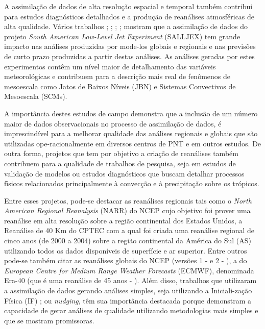 A assimilação de dados de alta resolução espacial e temporal também contribui para estudos diagnósticos detalhados e a produção de reanálises atmosféricas de alta qualidade. Vários trabalhos \cite{cavalcantiherdies04}; \cite{herdiesetal06}; \cite{rozantecavalcanti07}; \cite{herdiesetal07}; \cite{skabarnicolini09} mostram que a assimilação de dados do projeto \textit{South American Low-Level Jet Experiment} (SALLJEX) tem grande impacto nas análises produzidas por mode-los globais e regionais e nas previsões de curto prazo produzidas a partir destas análises. As análises geradas por estes experimentos contêm um nível maior de detalhamento das variáveis meteorológicas e contribuem para a descrição mais real de fenômenos de mesoescala como Jatos de Baixos Níveis (JBN) e Sistemas Convectivos de Mesoescala (SCMs). 

A importância destes estudos de campo demonstra que a inclusão de um número maior de dados observacionais no processo de assimilação de dados, é imprescindível para a melhorar qualidade das análises regionais e globais que são utilizadas ope-racionalmente em diversos centros de PNT e em outros estudos. De outra forma, projetos que tem por objetivo a criação de reanálises também contribuem para a qualidade de trabalhos de pesquisa, seja em estudos de validação de modelos ou estudos diagnósticos que buscam detalhar processos físicos relacionados principalmente à convecção e à precipitação sobre os trópicos. 

Entre esses projetos, pode-se destacar as reanálises regionais tais como o \textit{North American Regional Reanalysis} (NARR) do NCEP \cite{messingeretal06} cujo objetivo foi prover uma reanálise em alta resolução sobre a região continental dos Estados Unidos, a Reanálise de 40 Km do CPTEC \cite{aravequiaetal07} com a qual foi criada uma reanálise regional de cinco anos (de 2000 a 2004) sobre a região continental da América do Sul (AS) utilizando todos os dados disponíveis de superfície e ar superior. Entre outros pode-se também citar as reanálises globais do NCEP (versões 1 -  e 2 - ), a do \textit{European Centre for Medium Range Weather Forecasts} (ECMWF), denominada Era-40 (que é uma reanálise de 45 anos - ). Além disso, trabalhos que utilizaram a assimilação de dados gerando análises simples, seja utilizando a Iniciali-zação Física (IF) \cite{nunescocke04}; \cite{biazettoetal05} ou \textit{nudging}, têm sua importância destacada porque demonstram a capacidade de gerar análises de qualidade utilizando metodologias mais simples e que se mostram promissoras. 

